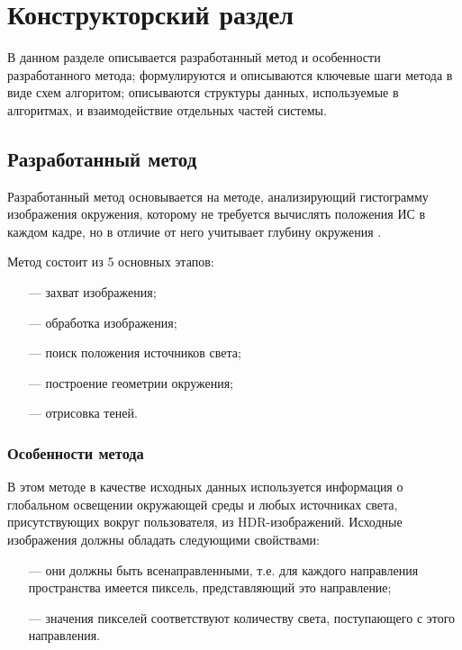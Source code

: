 \chapter{Конструкторский раздел}

В данном разделе описывается разработанный метод и особенности разработанного метода; формулируются и описываются ключевые шаги метода в виде схем алгоритом; описываются структуры данных, используемые в алгоритмах, и взаимодействие отдельных частей системы.

\section{Разработанный метод}

Разработанный метод основывается на методе, анализирующий гистограмму изображения окружения, которому не требуется вычислять положения ИС в каждом кадре, но в отличие от него учитывает глубину окружения \cite{osti2019real}.

Метод состоит из 5 основных этапов:

\begin{enumerate}
	\item[---] захват изображения;
	\item[---] обработка изображения;
	\item[---] поиск положения источников света;
	\item[---] построение геометрии окружения;
	\item[---] отрисовка теней.
\end{enumerate}

\subsection{Особенности метода}

В этом методе в качестве исходных данных используется информация о глобальном освещении окружающей среды и любых источниках света, присутствующих вокруг пользователя, из HDR-изображений. Исходные изображения должны обладать следующими свойствами:

\begin{itemize}
	\item[---] они должны быть всенаправленными, т.е. для каждого направления пространства имеется пиксель, представляющий это направление;
	\item[---] значения пикселей соответствуют количеству света, поступающего с этого направления.
\end{itemize}

